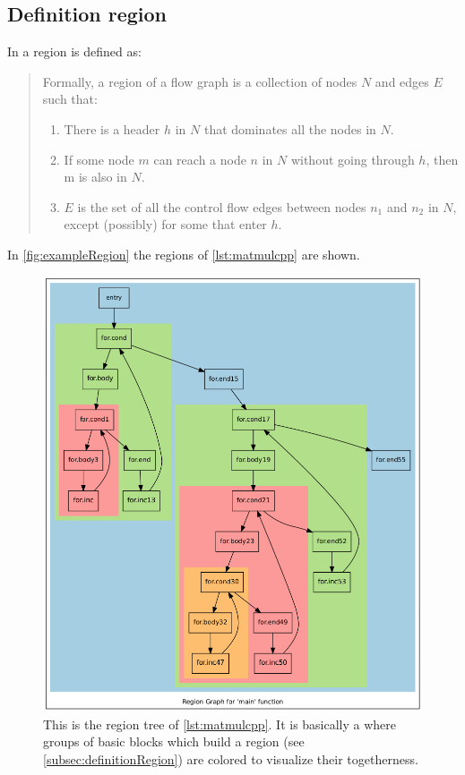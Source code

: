 \subsection{Definition region}\label{subsec:definitionRegion}
In \cite[chapter 9.7.1, p.~672]{Drachenbuch} a region is defined as:

\begin{quotation}\noindent
    \grqq Formally, a region of a flow graph is a collection of nodes \(N\) and edges \(E\) such that:
    \begin{enumerate}
        \item There is a header \(h\) in \(N\) that dominates all the nodes in \(N\).
        \item If some node \(m\) can reach a node \(n\) in \(N\) without going through \(h\), then m is also in \(N\).
        \item \(E\) is the set of all the control flow edges between nodes \(n_1\) and \(n_2\) in \(N\), except (possibly) for some that enter \(h\).\grqq
    \end{enumerate}
\end{quotation}
In \autoref{fig:exampleRegion} the regions of \autoref{lst:matmulcpp} are shown.
\begin{figure}[!h]
    \centering
    \caption[The region tree of \autoref{lst:matmulcpp}]{
        This is the region tree of \autoref{lst:matmulcpp}.
        It is basically a \cfg where groups of basic blocks which build a region (see \autoref{subsec:definitionRegion}) are colored to visualize their togetherness.
    }
    \label{fig:exampleRegion}
    \includegraphics[width=\textwidth]{gfx/matmulRegions.png}
\end{figure}
